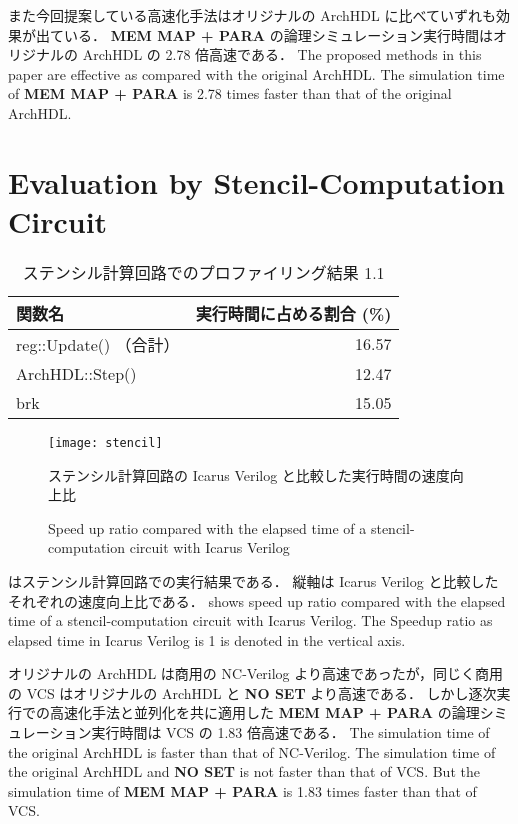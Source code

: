また今回提案している高速化手法はオリジナルの ArchHDL に比べていずれも効果が出ている．
\textbf{MEM MAP + PARA} の論理シミュレーション実行時間はオリジナルの ArchHDL の 2.78 倍高速である．
\fi
The proposed methods in this paper are effective as compared with the original ArchHDL.
The simulation time of \textbf{MEM MAP + PARA} is 2.78 times faster than that of the original ArchHDL.


\section{Evaluation by Stencil-Computation Circuit}


\begin{table}[tb]
 \caption{ステンシル計算回路でのプロファイリング結果 1.1}
 \label{table:stencil_prof1.1}
 \begin{center}
  \begin{tabular}{lr} \toprule
  関数名 & 実行時間に占める割合 (\%) \\ \midrule
  reg::Update() （合計） & 16.57 \\
  ArchHDL::Step() & 12.47 \\
  brk & 15.05 \\ \bottomrule
  \end{tabular}
 \end{center}
\end{table}

\fi

\begin{figure}[tb]
 \centering
 \texttt{[image: stencil]}
 \caption{ステンシル計算回路の Icarus Verilog と比較した実行時間の速度向上比}
\fi
 \caption{Speed up ratio compared with the elapsed time of a stencil-computation circuit with Icarus Verilog}
 \label{fig:stencil}
\end{figure}

 はステンシル計算回路での実行結果である．
縦軸は Icarus Verilog と比較したそれぞれの速度向上比である．
\fi
{} shows speed up ratio compared with the elapsed time of a stencil-computation circuit with Icarus Verilog.
The Speedup ratio as elapsed time in Icarus Verilog is 1 is denoted in the vertical axis.

オリジナルの ArchHDL は商用の NC-Verilog より高速であったが，同じく商用の VCS はオリジナルの ArchHDL と \textbf{NO SET} より高速である．
しかし逐次実行での高速化手法と並列化を共に適用した \textbf{MEM MAP + PARA} の論理シミュレーション実行時間は VCS の 1.83 倍高速である．
\fi
The simulation time of the original ArchHDL is faster than that of NC-Verilog.
The simulation time of the original ArchHDL and \textbf{NO SET} is not faster than that of VCS.
But the simulation time of \textbf{MEM MAP + PARA} is 1.83 times faster than that of VCS.

